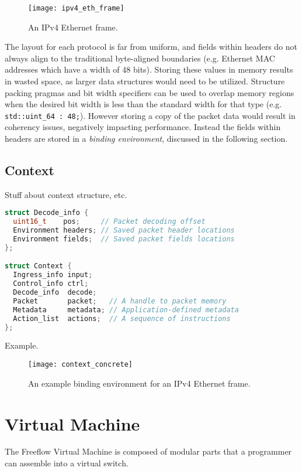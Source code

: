 \begin{figure}[h]
\centering
\texttt{[image: ipv4\_eth\_frame]}
\caption{An IPv4 Ethernet frame.}
\label{fig:ipv4_eth_frame}
\end{figure}

The layout for each protocol is far from uniform, and fields within headers do
not always align to the traditional byte-aligned boundaries (e.g. Ethernet
MAC addresses which have a width of 48 bits). Storing these values in memory
results in wasted space, as larger data structures would need to be utilized.
Structure packing pragmas and bit width specifiers can be used to overlap memory
regions when the desired bit width is less than the standard width for that type
(e.g. \lstinline{std::uint_64 : 48;}). However storing a copy of the packet data
would result in coherency issues, negatively impacting performance. Instead the
fields within headers are stored in a \emph{binding environment}, discussed in
the following section.

\subsection{Context}
Stuff about context structure, etc.

\lstset{basicstyle=\tiny}
\begin{lstlisting}[language=c++]
struct Decode_info {
  uint16_t    pos;     // Packet decoding offset
  Environment headers; // Saved packet header locations
  Environment fields;  // Saved packet fields locations
};

struct Context {
  Ingress_info input;
  Control_info ctrl;
  Decode_info  decode;
  Packet       packet;   // A handle to packet memory
  Metadata     metadata; // Application-defined metadata
  Action_list  actions;  // A sequence of instructions
};
\end{lstlisting}

Example.

\begin{figure}[h]
\centering
\texttt{[image: context\_concrete]}
\caption{An example binding environment for an IPv4 Ethernet frame.}
\label{fig:context_binding}
\end{figure}

\section{Virtual Machine}
\label{vm}
The Freeflow Virtual Machine is composed of modular parts that a programmer can
assemble into a virtual switch.

